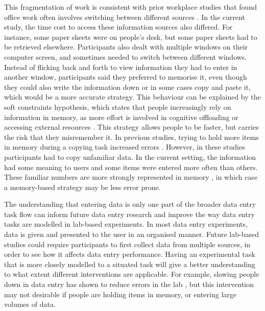 This fragmentation of work is consistent with prior workplace studies that found  office work often involves switching between different sources \citep{Cangiano2009, Czerwinski2004, Mark2005, Sellberg2014}. In the current study, the time cost to access these information sources also differed. For instance, some paper sheets were on people's desk, but some paper sheets had to be retrieved elsewhere. Participants also dealt with multiple windows on their computer screen, and sometimes needed to switch between different windows. Instead of flicking back and forth to view information they had to enter in another window, participants said they preferred to memorise it, even though they could also write the information down or in some cases copy and paste it, which would be a more accurate strategy. This behaviour can be explained by the soft constraints hypothesis, which states that people increasingly rely on information in memory, as more effort is involved in cognitive offloading or accessing external resources \citep{Gray2006}. This strategy allows people to be faster, but carries the risk that they misremember it. In previous studies, trying to hold more items in memory during a copying task increased errors \citep[e.g.][]{Borghouts2015, Morgan2009}. However, in these studies participants had to copy unfamiliar data. In the current setting, the information had some meaning to users and some items were entered more often than others. These familiar numbers are more strongly represented in memory \citep{Wiseman2014}, in which case a memory-based strategy may be less error prone.

The understanding that entering data is only one part of the broader data entry task flow can inform future data entry research and improve the way data entry tasks are modelled in lab-based experiments. In most data entry experiments, data is given and presented to the user in an organised manner. Future lab-based studies could require participants to first collect data from multiple sources, in order to see how it affects data entry performance. Having an experimental task that is more closely modelled to a situated task will give a better understanding to what extent different interventions are applicable. For example, slowing people down in data entry has shown to reduce errors in the lab \citep{Gould2016, Wiseman2013a}, but this intervention may not desirable if people are holding items in memory, or entering large volumes of data.

